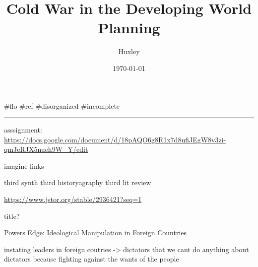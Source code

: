\documentclass[letterpaper]{article}
\author{Huxley}
\date{\today}
\title{Cold War in the Developing World Planning}
\renewcommand\maketitle{}
\begin{document}
\maketitle
\#flo \#ref \#disorganized \#incomplete

\noindent\rule{\textwidth}{0.5pt}

asssignment:
\url{https://docs.google.com/document/d/18pAQO6g8R1x7d8ufiJEgW8v3zi-qmJeRJX5nueh9W\_Y/edit}

imagine links

third synth third historyagraphy third lit review

\url{https://www.jstor.org/stable/2936421?seq=1}

title?

Powers Edge: Ideological Manipulation in Foreign Countries

instating leaders in foreign coutries -> dictators that we cant do
anything about dictators because fighting against the wants of the
people
\end{document}
